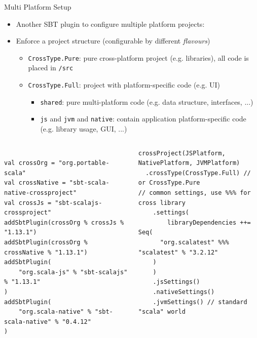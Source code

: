 \documentclass[presentation, 9pt]{beamer}\mode<presentation>{\usetheme{AMSBolognaFC}}
\begin{document}
\begin{frame}[fragile]{Multi Platform Setup \href{https://github.com/unibo-pps/scala-cross-project}{\faLink}}
	\begin{itemize}
		\item Another SBT plugin to configure multiple platform projects:  \href{https://github.com/portable-scala/sbt-crossproject}{\faLink}
  	\item Enforce a project structure (configurable by different \emph{flavours})
		\begin{itemize}
			\item \texttt{CrossType.Pure}: pure cross-platform project (e.g. libraries), all code is placed in \texttt{/src}
   		\item \texttt{CrossType.Full}: project with platform-specific code (e.g. UI)
			\begin{itemize}
				\item \texttt{shared}: pure multi-platform code (e.g. data structure, interfaces, ...)
    		\item \texttt{js} and \texttt{jvm} and \texttt{native}: contain application platform-specific code (e.g. library usage, GUI, ...)
			\end{itemize}
		\end{itemize}
	\end{itemize}
	\begin{columns}
		\begin{column}[c]{0.5\textwidth}
			\begin{tcolorbox}[left=0pt, top=0pt, bottom=0pt, title=project/plugins.sbt]
				\begin{verbatim}

val crossOrg = "org.portable-scala"
val crossNative = "sbt-scala-native-crossproject"
val crossJs = "sbt-scalajs-crossproject"
addSbtPlugin(crossOrg % crossJs % "1.13.1")
addSbtPlugin(crossOrg % crossNative % "1.13.1")
addSbtPlugin(
	"org.scala-js" % "sbt-scalajs" % "1.13.1"
)
addSbtPlugin(
	"org.scala-native" % "sbt-scala-native" % "0.4.12"
)
				\end{verbatim}
			\end{tcolorbox}
		\end{column}

		\begin{column}[c]{0.5\textwidth}
			\begin{tcolorbox}[left=0pt, top=0pt, bottom=0pt, title=build.sbt]
				\begin{verbatim}
crossProject(JSPlatform, NativePlatform, JVMPlatform)
  .crossType(CrossType.Full) // or CrossType.Pure
// common settings, use %%% for cross library
	.settings(
		libraryDependencies ++= Seq(
      "org.scalatest" %%% "scalatest" % "3.2.12"
    )
	)
	.jsSettings()
	.nativeSettings()
	.jvmSettings() // standard "scala" world
				\end{verbatim}
			\end{tcolorbox}
		\end{column}
	\end{columns}
\end{frame}
\end{document}
